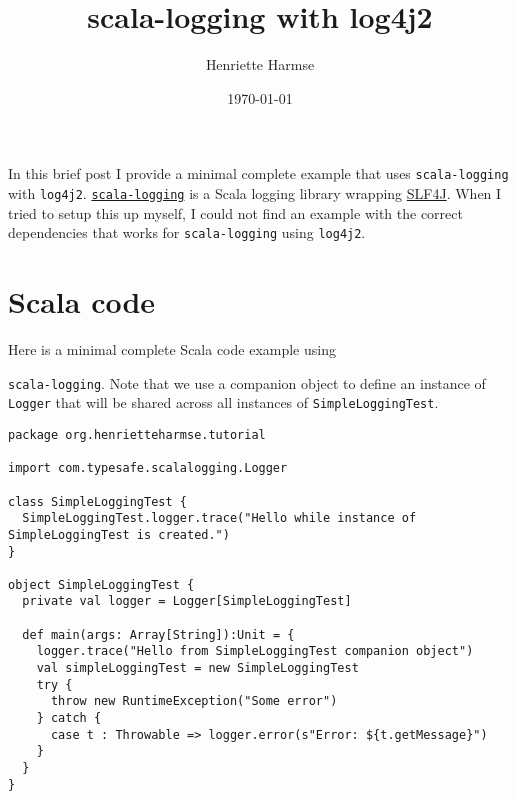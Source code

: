\documentclass{amsart}
\title{scala-logging with log4j2}
\author{Henriette Harmse}
\date{\today}
\begin{document}
  \maketitle
  In this brief post I provide a minimal complete example that uses \texttt{scala-logging} with \texttt{log4j2}. \href{https://github.com/lightbend/scala-logging}{\texttt{scala-logging}} is a Scala logging library wrapping \href{http://www.slf4j.org/}{SLF4J}. 
  When I tried to setup this up myself, I could not find an example with the correct dependencies that works for \texttt{scala-logging} using \texttt{log4j2}. 
  
  \section{Scala code}
  Here is a minimal complete Scala code example using {\texttt{scala-logging}. Note that we use a companion object to define an instance of \texttt{Logger} that will be shared across all instances of \texttt{SimpleLoggingTest}.
\begin{small}
\begin{verbatim} 
package org.henrietteharmse.tutorial

import com.typesafe.scalalogging.Logger

class SimpleLoggingTest {
  SimpleLoggingTest.logger.trace("Hello while instance of SimpleLoggingTest is created.")
}

object SimpleLoggingTest {
  private val logger = Logger[SimpleLoggingTest]

  def main(args: Array[String]):Unit = {
    logger.trace("Hello from SimpleLoggingTest companion object")
    val simpleLoggingTest = new SimpleLoggingTest
    try {
      throw new RuntimeException("Some error")
    } catch {
      case t : Throwable => logger.error(s"Error: ${t.getMessage}")
    }    
  }
}
\end{verbatim}
\end{small}

}
\end{document}
